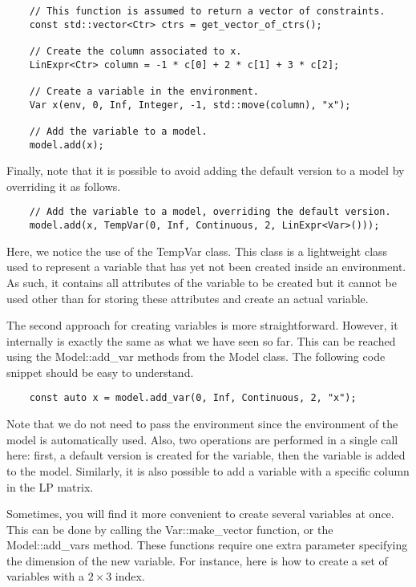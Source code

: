 \begin{lstlisting}
    // This function is assumed to return a vector of constraints.
    const std::vector<Ctr> ctrs = get_vector_of_ctrs(); 

    // Create the column associated to x.
    LinExpr<Ctr> column = -1 * c[0] + 2 * c[1] + 3 * c[2];

    // Create a variable in the environment.
    Var x(env, 0, Inf, Integer, -1, std::move(column), "x");

    // Add the variable to a model.
    model.add(x);
\end{lstlisting}

Finally, note that it is possible to avoid adding the default version to a
model by overriding it as follows. 

\begin{lstlisting}
    // Add the variable to a model, overriding the default version. 
    model.add(x, TempVar(0, Inf, Continuous, 2, LinExpr<Var>()));
\end{lstlisting}

Here, we notice the use of the \textsf{TempVar} class. This class is a
lightweight class used to represent a variable that has yet not been created
inside an environment. As such, it contains all attributes of the variable to
be created but it cannot be used other than for storing these attributes and
create an actual variable.

The second approach for creating variables is more straightforward. However,
it internally is exactly the same as what we have seen so far. This can be
reached using the \textsf{Model::add\_var} methods from the \textsf{Model}
class. The following code snippet should be easy to understand.

\begin{lstlisting}
    const auto x = model.add_var(0, Inf, Continuous, 2, "x");
\end{lstlisting}
Note that we do not need to pass the environment since the environment of the
model is automatically used. Also, two operations are performed in a single
call here: first, a default version is created for the variable, then the
variable is added to the model. Similarly, it is also possible to add a
variable with a specific column in the LP matrix. 

Sometimes, you will find it more convenient to create several variables at
once. This can be done by calling the \textsf{Var::make\_vector} function, or
the \textsf{Model::add\_vars} method. These functions require one extra
parameter specifying the dimension of the new variable. For instance, here is
how to create a set of variables with a $2\times 3$ index.

